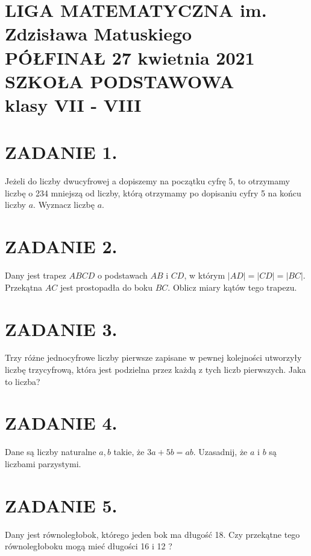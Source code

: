 \documentclass[10pt]{article}
\begin{document}
\section*{LIGA MATEMATYCZNA im. Zdzisława Matuskiego \\
 PÓŁFINAŁ 27 kwietnia 2021 \\
 SZKOŁA PODSTAWOWA \\
 klasy VII - VIII}
\section*{ZADANIE 1.}
Jeżeli do liczby dwucyfrowej a dopiszemy na początku cyfrę 5, to otrzymamy liczbę o 234 mniejszą od liczby, którą otrzymamy po dopisaniu cyfry 5 na końcu liczby \(a\). Wyznacz liczbę \(a\).

\section*{ZADANIE 2.}
Dany jest trapez \(A B C D\) o podstawach \(A B\) i \(C D\), w którym \(|A D|=|C D|=|B C|\). Przekątna \(A C\) jest prostopadła do boku \(B C\). Oblicz miary kątów tego trapezu.

\section*{ZADANIE 3.}
Trzy różne jednocyfrowe liczby pierwsze zapisane w pewnej kolejności utworzyły liczbę trzycyfrową, która jest podzielna przez każdą z tych liczb pierwszych. Jaka to liczba?

\section*{ZADANIE 4.}
Dane są liczby naturalne \(a, b\) takie, że \(3 a+5 b=a b\). Uzasadnij, że \(a\) i \(b\) są liczbami parzystymi.

\section*{ZADANIE 5.}
Dany jest równoległobok, którego jeden bok ma długość 18. Czy przekątne tego równoległoboku mogą mieć długości 16 i 12 ?
\end{document}
